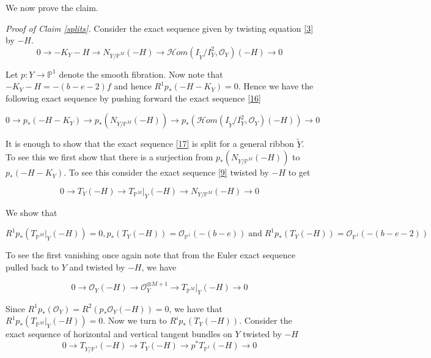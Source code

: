 \documentclass[11pt,twoside]{amsart}
\theoremstyle{plain}
\numberwithin{equation}{section}
\theoremstyle{definition}
\begin{document}
We now prove the claim.

\smallskip

\textit{Proof of Claim \ref{splits}.} Consider the exact sequence given by twisting equation \ref{3} by $-H$. 
\begin{equation}\label{16}
0 \to -K_Y-H \to N_{Y/\mathbb{P}^M}(-H) \to \mathcal{H}om(I_{\widetilde{Y}}/I_{Y}^2, \mathcal{O}_Y)(-H) \to 0
\end{equation}

Let $p: Y \to \mathbb{P}^1$ denote the smooth fibration. Now note that $-K_Y-H = -(b-e-2)f$ and hence $R^1p_*(-H-K_Y) = 0$. Hence we have the following exact sequence by pushing forward the exact sequence \ref{16}

\begin{equation}\label{17}
    0 \to p_*(-H-K_Y) \to p_*(N_{Y/\mathbb{P}^M}(-H)) \to p_*(\mathcal{H}om(I_{\widetilde{Y}}/I_{Y}^2, \mathcal{O}_Y)(-H)) \to 0
\end{equation}
    
It is enough to show that the exact sequence \ref{17} is split for a general ribbon $\widetilde{Y}$. To see this we first show that there is a surjection from $p_*(N_{Y/\mathbb{P}^M}(-H))$ to $p_*(-H-K_Y)$. To see this consider the exact sequence \ref{9} twisted by $-H$ to get 

\begin{equation}\label{18}
   0 \to T_Y(-H) \to T_{\mathbb{P}^M}|_Y(-H) \to N_{Y/\mathbb{P}^M}(-H) \to 0 
\end{equation}

We show that

\begin{equation*}
   R^1p_*(T_{\mathbb{P}^M}|_Y(-H)) = 0, p_*(T_Y(-H)) = \mathcal{O}_{\mathbb{P}^1}(-(b-e)) \operatorname{and} R^1p_*(T_Y(-H)) =  \mathcal{O}_{\mathbb{P}^1}(-(b-e-2))  
\end{equation*}

To see the first vanishing once again note that from the Euler exact sequence pulled back to $Y$ and twisted by $-H$, we have 

\begin{equation}\label{24}
    0 \to \mathcal{O}_Y(-H) \to \mathcal{O}_Y^{\otimes M+1} \to T_{\mathbb{P}^M}|_Y(-H) \to 0
\end{equation}

Since $R^1p_*(\mathcal{O}_Y) = R^2(p_*\mathcal{O}_Y(-H)) = 0$, we have that $R^1p_*(T_{\mathbb{P}^M}|_Y(-H)) = 0$. Now we turn to $R^ip_*(T_Y(-H))$. Consider the exact sequence of horizontal and vertical tangent bundles on $Y$ twisted by $-H$
\begin{equation}\label{19}
    0 \to T_{Y/\mathbb{P}^1}(-H) \to T_Y(-H) \to p^*T_{\mathbb{P}^1}(-H) \to 0
\end{equation}
\end{document}
